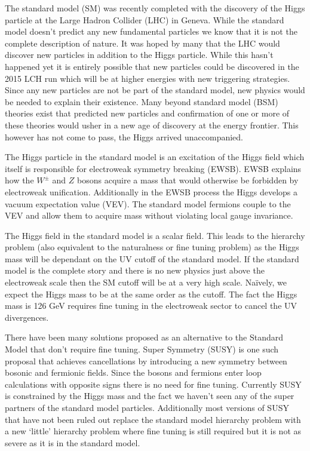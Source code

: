 
The standard model (SM) was recently completed with the discovery of the Higgs particle at the Large Hadron Collider (LHC) in Geneva.
While the standard model doesn't predict any new fundamental particles we know that it is not the complete description of nature.
It was hoped by many that the LHC would discover new particles in addition to the Higgs particle.
While this hasn't happened yet it is entirely possible that new particles could be discovered in the 2015 LCH run which will be at higher energies with new triggering strategies.
Since any new particles are not be part of the standard model, new physics would be needed to explain their existence.
Many beyond standard model (BSM) theories exist that predicted new particles and confirmation of one or more of these theories would usher in a new age of discovery at the energy frontier. 
This however has not come to pass, the Higgs arrived unaccompanied.

The Higgs particle in the standard model is an excitation of the Higgs field which itself is responsible for electroweak symmetry breaking (EWSB).
EWSB explains how the $W^{\pm}$ and $Z$ bosons acquire a mass that would otherwise be forbidden by electroweak unification.
Additionally in the EWSB process the Higgs develops a vacuum expectation value (VEV).
The standard model fermions couple to the VEV and allow them to acquire mass without violating local gauge invariance.

The Higgs field in the standard model is a scalar field.
This leads to the hierarchy problem (also equivalent to the naturalness or fine tuning problem) as the Higgs mass will be dependant on the UV cutoff of the standard model.
If the standard model is the complete story and there is no new physics just above the electroweak scale then the SM cutoff will be at a very high scale.
Naïvely, we expect the Higgs mass to be at the same order as the cutoff.
The fact the Higgs mass is 126 GeV requires fine tuning in the electroweak sector to cancel the UV divergences.

There have been many solutions proposed as an alternative to the Standard Model that don't require fine tuning.
Super Symmetry (SUSY) is one such proposal that achieves cancellations by introducing a new symmetry between bosonic and fermionic fields.
Since the bosons and fermions enter loop calculations with opposite signs there is no need for fine tuning.
Currently SUSY is constrained by the Higgs mass and the fact we haven't seen any of the super partners of the standard model particles.
Additionally most versions of SUSY that have not been ruled out replace the standard model hierarchy problem with a new  `little' hierarchy problem where fine tuning is still required but it is not as severe as it is in the standard model.

